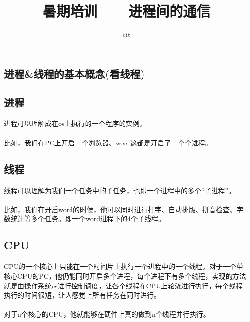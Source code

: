 \documentclass[12pt]{article}
\author{qit}
\title{暑期培训——进程间的通信}
\begin{document}
\begin{CJK}{UTF8}{gbsn}
\maketitle

\section{进程\&线程的基本概念(看线程)}
\subsection{进程}
\paragraph{}进程可以理解成在os上执行的一个程序的实例。
\paragraph{}比如，我们在PC上开启一个浏览器、word这都是开启了一个个进程。
\subsection{线程}
\paragraph{}线程可以理解为我们一个任务中的子任务，也即一个进程中的多个“子进程”。
\paragraph{}比如，我们在开启word的时候，他可以同时进行打字、自动排版、拼音检查、字数统计等多个任务。即一个word进程下的4个子线程。
\subsection{CPU}
\paragraph{}CPU的一个核心上只能在一个时间片上执行一个进程中的一个线程。对于一个单核心CPU的PC，他仍能同时开启多个进程，每个进程下有多个线程，实现的方法就是由操作系统os进行控制调度，让各个线程在CPU上轮流进行执行，每个线程执行的时间很短，让人感觉上所有任务在同时进行。
\paragraph{}对于n个核心的CPU，他就能够在硬件上真的做到n个线程并行执行。

\end{CJK}
\end{document}
